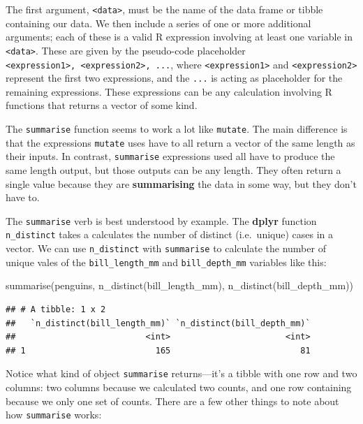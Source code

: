 \documentclass[
]{book}
\newenvironment{Shaded}{\begin{snugshade}}{\end{snugshade}}
\newcommand{\FunctionTok}[1]{\textcolor[rgb]{0.00,0.00,0.00}{#1}}
\newcommand{\NormalTok}[1]{#1}
\begin{document}
The first argument, \texttt{\textless{}data\textgreater{}}, must be the name of the data frame or tibble containing our data. We then include a series of one or more additional arguments; each of these is a valid R expression involving at least one variable in \texttt{\textless{}data\textgreater{}}. These are given by the pseudo-code placeholder \texttt{\textless{}expression1\textgreater{},\ \textless{}expression2\textgreater{},\ ...}, where \texttt{\textless{}expression1\textgreater{}} and \texttt{\textless{}expression2\textgreater{}} represent the first two expressions, and the \texttt{...} is acting as placeholder for the remaining expressions. These expressions can be any calculation involving R functions that returns a vector of some kind.

The \texttt{summarise} function seems to work a lot like \texttt{mutate}. The main difference is that the expressions \texttt{mutate} uses have to all return a vector of the same length as their inputs. In contrast, \texttt{summarise} expressions used all have to produce the same length output, but those outputs can be any length. They often return a single value because they are \textbf{summarising} the data in some way, but they don't have to.

The \texttt{summarise} verb is best understood by example. The \textbf{dplyr} function \texttt{n\_distinct} takes a calculates the number of distinct (i.e.~unique) cases in a vector. We can use \texttt{n\_distinct} with \texttt{summarise} to calculate the number of unique vales of the \texttt{bill\_length\_mm} and \texttt{bill\_depth\_mm} variables like this:

\begin{Shaded}
\begin{Highlighting}[]
\FunctionTok{summarise}\NormalTok{(penguins, }\FunctionTok{n\_distinct}\NormalTok{(bill\_length\_mm), }\FunctionTok{n\_distinct}\NormalTok{(bill\_depth\_mm))}
\end{Highlighting}
\end{Shaded}

\begin{verbatim}
## # A tibble: 1 x 2
##   `n_distinct(bill_length_mm)` `n_distinct(bill_depth_mm)`
##                          <int>                       <int>
## 1                          165                          81
\end{verbatim}

Notice what kind of object \texttt{summarise} returns---it's a tibble with one row and two columns: two columns because we calculated two counts, and one row containing because we only one set of counts. There are a few other things to note about how \texttt{summarise} works:
\end{document}

